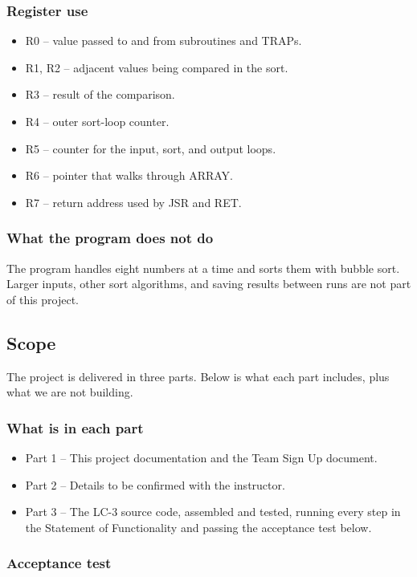 \documentclass[11pt]{article}
\begin{document}
\subsubsection*{Register use}

\begin{itemize}
  \item R0 -- value passed to and from subroutines and TRAPs.
  \item R1, R2 -- adjacent values being compared in the sort.
  \item R3 -- result of the comparison.
  \item R4 -- outer sort-loop counter.
  \item R5 -- counter for the input, sort, and output loops.
  \item R6 -- pointer that walks through ARRAY.
  \item R7 -- return address used by JSR and RET.
\end{itemize}
\subsubsection*{What the program does not do}

The program handles eight numbers at a time and sorts them with bubble sort. Larger inputs, other sort algorithms, and saving results between runs are not part of this project.


\subsection*{Scope}

The project is delivered in three parts. Below is what each part includes, plus what we are not building.


\subsubsection*{What is in each part}

\begin{itemize}
  \item Part 1 -- This project documentation and the Team Sign Up document.
  \item Part 2 -- Details to be confirmed with the instructor.
  \item Part 3 -- The LC-3 source code, assembled and tested, running every step in the Statement of Functionality and passing the acceptance test below.
\end{itemize}
\subsubsection*{Acceptance test}
\end{document}
